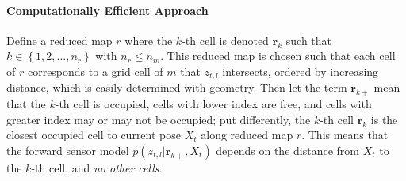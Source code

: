 \documentclass[letterpaper, 10pt, conference]{ieeeconf}
\newcommand{\braces}[1]{\ensuremath{\left\{ #1 \right\}}}
\begin{document}
\paragraph{Computationally Efficient Approach}
Define a reduced map $r$ where the $k$-th cell is denoted $\mathbf{r}_k$ such that $k\in\braces{1,2,...,n_r}$ with $n_r\leq n_m$.
This reduced map is chosen such that each cell of $r$ corresponds to a grid cell of $m$ that $z_{t,l}$ intersects, ordered by increasing distance, which is easily determined with geometry.
Then let the term $\mathbf{r}_{k+}$ mean that the $k$-th cell is occupied, cells with lower index are free, and cells with greater index may or may not be occupied; put differently, the $k$-th cell $\mathbf{r}_k$ is the closest occupied cell to current pose $X_t$ along reduced map $r$.
This means that the forward sensor model $p(z_{t,l}|\mathbf{r}_{k+},X_{t})$ depends on the distance from $X_t$ to the $k$-th cell, and \emph{no other cells}.
\end{document}
